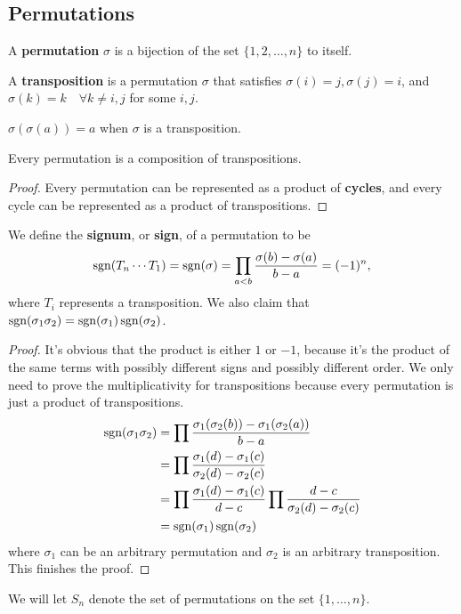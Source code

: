 \subsection{Permutations}
\begin{df}
A \textbf{permutation} $\sigma$ is a bijection of the set $\lbrace 1, 2,
\dots, n \rbrace$ to itself.
\end{df}

\begin{df}
A \textbf{transposition} is a permutation $\sigma$ that satisfies
$\sigma(i) = j, \sigma(j) = i$, and $\sigma(k) = k \quad \forall k \neq
i, j$ for some $i, j$.
\end{df}

\begin{rem}
$\sigma(\sigma(a)) = a$ when $\sigma$ is a transposition.
\end{rem}

\begin{prop}
Every permutation is a composition of transpositions.
\end{prop}

\begin{proof}
Every permutation can be represented as a product of \textbf{cycles},
and every cycle can be represented as a product of transpositions.
\end{proof}

\begin{prop}
We define the \textbf{signum}, or \textbf{sign}, of a permutation to be
\[ \operatorname{sgn}(T_n \cdots T_1) = \operatorname{sgn}(\sigma) = \prod_{a < b} \frac{\sigma(b) -
\sigma(a)}{b - a} = (-1)^n, \]
where $T_i$ represents a transposition. We also claim that
$\operatorname{sgn}(\sigma_1 \sigma_2) = \operatorname{sgn}(\sigma_1) \operatorname{sgn}(\sigma_2)$.
\end{prop}

\begin{proof}
It's obvious that the product is either $1$ or $-1$, because it's the
product of the same terms with possibly different signs and possibly
different order. We only need to prove the multiplicativity for
transpositions because every permutation is just a product of
transpositions.
\[ \begin{aligned}
\operatorname{sgn}(\sigma_1 \sigma_2) &= \prod \frac{\sigma_1(\sigma_2(b)) -
\sigma_1(\sigma_2(a))}{b - a} \\
&= \prod \frac{\sigma_1(d) - \sigma_1(c)}{\sigma_2(d) - \sigma_2(c)} \\
&= \prod \frac{\sigma_1(d) - \sigma_1(c)}{d - c} \prod \frac{d -
c}{\sigma_2(d) - \sigma_2(c)} \\
&= \operatorname{sgn}(\sigma_1) \operatorname{sgn}(\sigma_2)
\end{aligned} \]
where $\sigma_1$ can be an arbitrary permutation and $\sigma_2$ is an
arbitrary transposition. This finishes the proof.
\end{proof}

\begin{df}
We will let $S_n$ denote the set of permutations on the set $\lbrace 1,
\dots, n \rbrace$.
\end{df}
